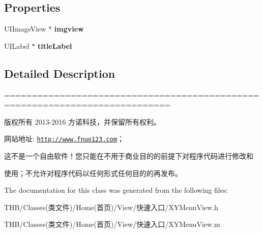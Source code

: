 \subsection*{Properties}
\begin{DoxyCompactItemize}
\item 
\mbox{\label{interface_x_y_menu_view_a2a33e5a9bfcf5559617ef2c3e07545e6}} 
U\+I\+Image\+View $\ast$ {\bfseries imgview}
\item 
\mbox{\label{interface_x_y_menu_view_a04be9e2d046bab9bfd0f60735242927c}} 
U\+I\+Label $\ast$ {\bfseries title\+Label}
\end{DoxyCompactItemize}


\subsection{Detailed Description}
============================================================================

版权所有 2013-\/2016 方诺科技，并保留所有权利。

网站地址\+: \href{http://www.fnuo123.com}{\tt http\+://www.\+fnuo123.\+com}； 



这不是一个自由软件！您只能在不用于商业目的的前提下对程序代码进行修改和

使用；不允许对程序代码以任何形式任何目的的再发布。 

 

The documentation for this class was generated from the following files\+:\begin{DoxyCompactItemize}
\item 
T\+H\+B/\+Classes(类文件)/\+Home(首页)/\+View/快速入口/X\+Y\+Menu\+View.\+h\item 
T\+H\+B/\+Classes(类文件)/\+Home(首页)/\+View/快速入口/X\+Y\+Menu\+View.\+m\end{DoxyCompactItemize}
